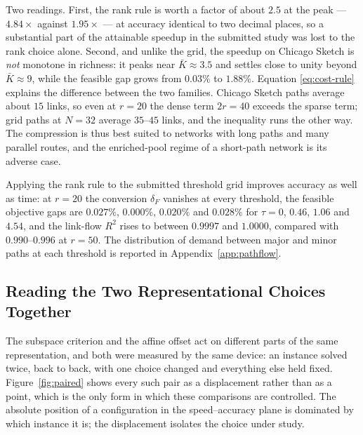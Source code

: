 \documentclass[11pt]{article}
\newif\ifshownotes \shownotesfalse
\newcommand{\conote}[1]{\ifshownotes{\color{red}\small\textsf{[Note to co-authors: #1]}}\fi}
\begin{document}
Two readings. First, the rank rule is worth a factor of about $2.5$ at the peak --- $4.84
\times$ against $1.95\times$ --- at accuracy identical to two decimal places, so a
substantial part of the attainable speedup in the submitted study was lost to the rank
choice alone. Second, and unlike the grid, the speedup on Chicago Sketch is \emph{not}
monotone in richness: it peaks near $\bar K\approx3.5$ and settles close to unity beyond
$\bar K\approx9$, while the feasible gap grows from $0.03\%$ to $1.88\%$. Equation
\eqref{eq:cost-rule} explains the difference between the two families. Chicago Sketch paths
average about $15$ links, so even at $r=20$ the dense term $2r=40$ exceeds the sparse term;
grid paths at $N=32$ average $35$--$45$ links, and the inequality runs the other way. The
compression is thus best suited to networks with long paths and many parallel routes, and the
enriched-pool regime of a short-path network is its adverse case.

Applying the rank rule to the submitted threshold grid improves accuracy as well as time: at
$r=20$ the conversion $\delta_F$ vanishes at every threshold, the feasible objective gaps are
$0.027\%$, $0.000\%$, $0.020\%$ and $0.028\%$ for $\tau=0$, $0.46$, $1.06$ and $4.54$, and
the link-flow $R^2$ rises to between $0.9997$ and $1.0000$, compared with $0.990$--$0.996$ at
$r=50$. The distribution of demand between major and minor paths at each threshold is
reported in Appendix~\ref{app:pathflow}.

\conote{Chicago Regional and Philadelphia are not yet re-evaluated at the corrected rank. The
submitted Regional pool ($879{,}625$ paths) is no longer on file; the closest available
instance has $2{,}024{,}525$ paths and $30$ links per path, which by \eqref{eq:cost-rule}
should favour $r\approx10$. A C\texttt{++} rank-by-offset experiment on it is running.
Referee~1 will reasonably note that our largest speedups come from Sioux Falls and a synthetic
grid, so carrying at least one large road network at the corrected rank matters more than any
other remaining item.}


\subsection{Reading the Two Representational Choices Together}
\label{sec:tradeoff}

The subspace criterion and the affine offset act on different parts of the same representation,
and both were measured by the same device: an instance solved twice, back to back, with one
choice changed and everything else held fixed. Figure~\ref{fig:paired} shows every such pair as
a displacement rather than as a point, which is the only form in which these comparisons are
controlled. The absolute position of a configuration in the speed--accuracy plane is dominated
by which instance it is; the displacement isolates the choice under study.
\end{document}
